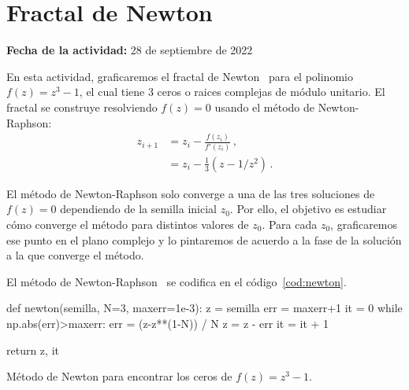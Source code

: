 \documentclass[../portafolio.tex]{subfiles}
\begin{document}


\section{Fractal de Newton} 

\hfill \textbf{Fecha de la actividad:} 28 de septiembre de 2022

\medskip

En esta actividad, graficaremos el fractal de Newton~\cite{ref:newton-fractal} para el polinomio
$f(z)=z^3-1$, el cual tiene 3 ceros o raices complejas de módulo
unitario. El fractal se construye resolviendo $f(z)=0$ usando el
método de Newton-Raphson:
\begin{align}
  \label{eq:newton-raphson}
  z_{i+1}
  &= z_{i} - \frac{f(z_i)}{f'(z_i)} \,,
  \\
  &= z_{i} - \frac{1}{3} \left( z - 1/z^2\right) \,.
\end{align}
%  

El método de Newton-Raphson solo converge a una de las tres soluciones
de $f(z)=0$ dependiendo de la semilla inicial $z_0$. Por ello, el
objetivo es estudiar cómo converge el método para distintos valores de
$z_0$. Para cada $z_0$, graficaremos ese punto en el plano complejo y
lo pintaremos de acuerdo a la fase de la solución a la que converge el
método.


El método de Newton-Raphson~\cite{ref:newton-raphson} se codifica en el código~\ref{cod:newton}.
\begin{listing}
  \begin{pythoncode}
def newton(semilla, N=3, maxerr=1e-3):
    z   = semilla
    err = maxerr+1
    it = 0
    while np.abs(err)>maxerr:
        err = (z-z**(1-N)) / N
        z = z - err
        it = it + 1

    return z, it
\end{pythoncode}
\caption{Método de Newton para encontrar los ceros de $f(z)=z^3-1$.}
\label{cod:newton}
\end{listing}
\end{document}
